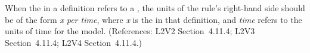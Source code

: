 When the  in a \RateRule definition refers to a \Parameter,
the units of the rule's right-hand side should be of the form \emph{x per
time}, where \emph{x} is the  in that \Parameter definition,
and \emph{time} refers to the units of time for the model.  (References:
L2V2 Section~4.11.4; L2V3 Section~4.11.4; L2V4 Section~4.11.4.)
